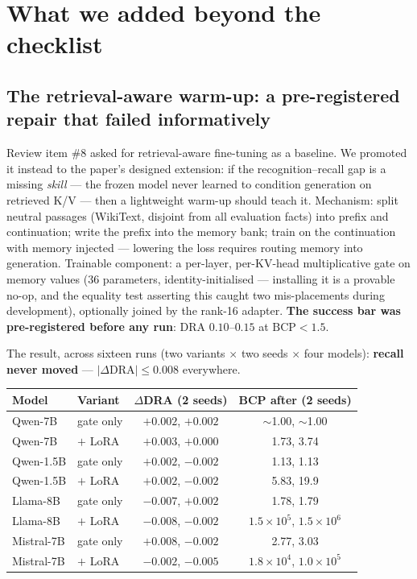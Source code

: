 \documentclass[11pt]{article}
\begin{document}
\section{What we added beyond the checklist}

\subsection{The retrieval-aware warm-up: a pre-registered repair that failed informatively}

Review item \#8 asked for retrieval-aware fine-tuning as a baseline. We promoted it instead to the
paper's designed extension: if the recognition--recall gap is a missing \emph{skill} --- the frozen
model never learned to condition generation on retrieved K/V --- then a lightweight warm-up should
teach it. Mechanism: split neutral passages (WikiText, disjoint from all evaluation facts) into
prefix and continuation; write the prefix into the memory bank; train on the continuation with
memory injected --- lowering the loss requires routing memory into generation. Trainable
component: a per-layer, per-KV-head multiplicative gate on memory values (36 parameters,
identity-initialised --- installing it is a provable no-op, and the equality test asserting this
caught two mis-placements during development), optionally joined by the rank-16 adapter.
\textbf{The success bar was pre-registered before any run}: DRA $0.10$--$0.15$ at
$\mathrm{BCP} < 1.5$.

The result, across sixteen runs (two variants $\times$ two seeds $\times$ four models):
\textbf{recall never moved} --- $|\Delta \mathrm{DRA}| \leq 0.008$ everywhere.

\begin{center}
\small
\begin{tabular}{@{}l l c c@{}}
\toprule
Model & Variant & $\Delta$DRA (2 seeds) & BCP after (2 seeds) \\
\midrule
Qwen-7B    & gate only & $+0.002$, $+0.002$ & $\sim$1.00, $\sim$1.00 \\
Qwen-7B    & $+$ LoRA  & $+0.003$, $+0.000$ & 1.73, 3.74 \\
Qwen-1.5B  & gate only & $+0.002$, $-0.002$ & 1.13, 1.13 \\
Qwen-1.5B  & $+$ LoRA  & $+0.002$, $-0.002$ & 5.83, 19.9 \\
Llama-8B   & gate only & $-0.007$, $+0.002$ & 1.78, 1.79 \\
Llama-8B   & $+$ LoRA  & $-0.008$, $-0.002$ & $1.5{\times}10^{5}$, $1.5{\times}10^{6}$ \\
Mistral-7B & gate only & $+0.008$, $-0.002$ & 2.77, 3.03 \\
Mistral-7B & $+$ LoRA  & $-0.002$, $-0.005$ & $1.8{\times}10^{4}$, $1.0{\times}10^{5}$ \\
\bottomrule
\end{tabular}
\end{center}
\end{document}
